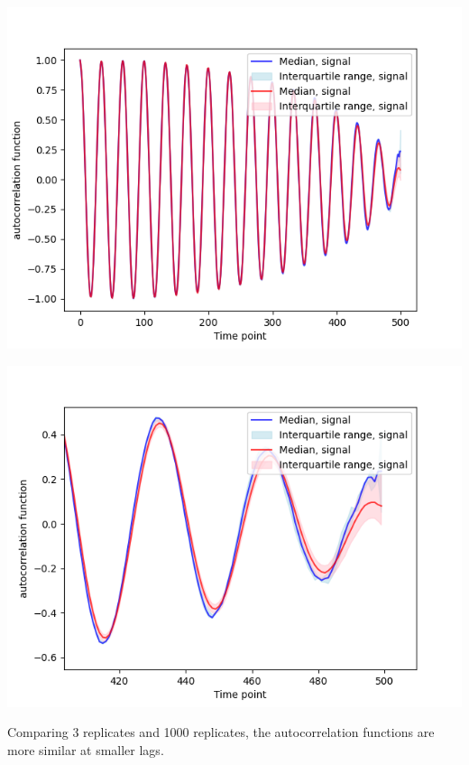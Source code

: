 \begin{enumerate}
\begin{enumerate}
\begin{enumerate}
\begin{center}
\includegraphics[width=.9\linewidth]{nonstat_3vs1000rep.png}
\end{center}
\begin{center}
\includegraphics[width=.9\linewidth]{nonstat_3vs1000rep_zoom.png}
\end{center}

Comparing 3 replicates and 1000 replicates, the autocorrelation functions are more similar at smaller lags.


\end{enumerate}
\end{enumerate}
\end{enumerate}
